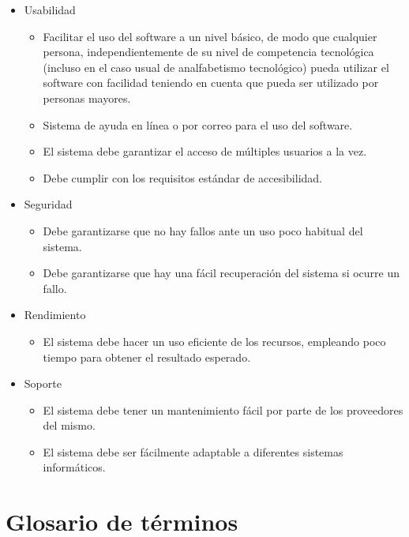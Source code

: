 \documentclass[11pt]{article}
\begin{document}
\begin{itemize}
\item Usabilidad
\begin{itemize}
\item Facilitar el uso del software a un nivel básico, de modo que cualquier persona, independientemente de su nivel de competencia tecnológica (incluso en el caso usual de analfabetismo tecnológico) pueda utilizar el software con facilidad teniendo en cuenta que pueda ser utilizado por personas mayores.
\item Sistema de ayuda en línea o por correo para el uso del software.
\item El sistema debe garantizar el acceso de múltiples usuarios a la vez.
\item Debe cumplir con los requisitos estándar de accesibilidad.
\end{itemize}

\item Seguridad
\begin{itemize}
\item Debe garantizarse que no hay fallos ante un uso poco habitual del sistema.
\item Debe garantizarse que hay una fácil recuperación del sistema si ocurre un fallo.
\end{itemize}

\item Rendimiento
\begin{itemize}
\item El sistema debe hacer un uso eficiente de los recursos, empleando poco tiempo para obtener el resultado esperado.
\end{itemize}

\item Soporte
\begin{itemize}
\item El sistema debe tener un mantenimiento fácil por parte de los proveedores del mismo.
\item El sistema debe ser fácilmente adaptable a diferentes sistemas informáticos.
\end{itemize}
\end{itemize}


\section{Glosario de términos}
\label{sec:org16a329e}
\end{document}
